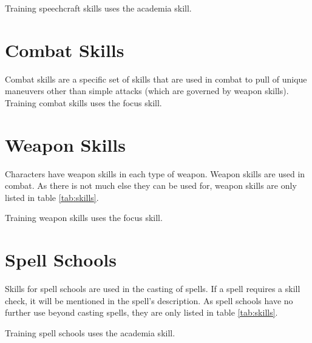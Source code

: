 \begin{multicols*}{2}
    Training speechcraft skills uses the academia skill.

    \section{Combat Skills}
    Combat skills are a specific set of skills that are used in combat to pull
    of unique maneuvers other than simple attacks (which are governed by weapon
    skills). Training combat skills uses the focus skill.

    \section{Weapon Skills}\label{weapon-skills}
    Characters have weapon skills in each type of weapon. Weapon skills are used in
    combat. As there is not much else they can be used for, weapon skills are only
    listed in table \ref{tab:skills}.

    Training weapon skills uses the focus skill.


    \section{Spell Schools}\label{spell-schools}
    Skills for spell schools are used in the casting of spells. If a spell requires
    a skill check, it will be mentioned in the spell's description. As spell
    schools have no further use beyond casting spells, they are only listed in
    table \ref{tab:skills}.

    Training spell schools uses the academia skill.
\end{multicols*}

